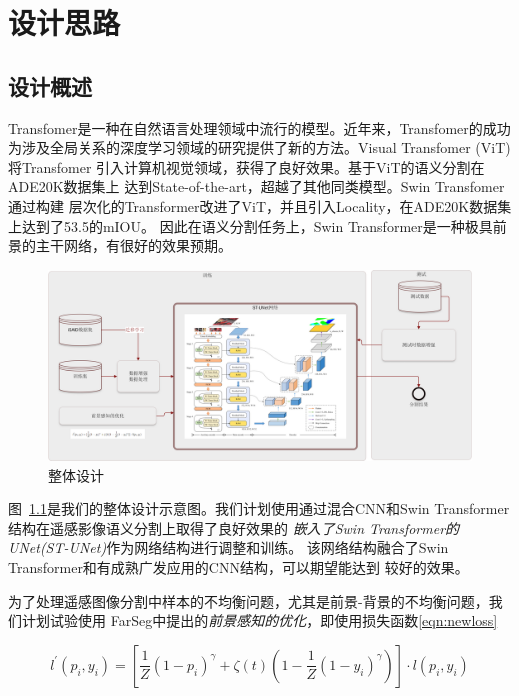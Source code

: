 \documentclass[a4paper,twoside,zihao=5,UTF8]{ctexrep}
\begin{document}
\part{设计思路}

\chapter{设计概述}
Transfomer是一种在自然语言处理领域中流行的模型。近年来，Transfomer的成功
为涉及全局关系的深度学习领域的研究提供了新的方法。Visual Transfomer (ViT)\cite{vit}将Transfomer
引入计算机视觉领域，获得了良好效果。基于ViT的语义分割\cite{segmenter}在ADE20K数据集上
达到State-of-the-art，超越了其他同类模型。Swin Transfomer\cite{swin}通过构建
层次化的Transformer改进了ViT，并且引入Locality，在ADE20K数据集上达到了53.5的mIOU。
因此在语义分割任务上，Swin Transformer是一种极具前景的主干网络，有很好的效果预期。

\begin{figure}[htbp]
    \includegraphics[width=\textwidth]{flowchart.png}
    \centering
    \caption{整体设计}
    \label{fig:fulldesign}
\end{figure}

图~\ref{fig:fulldesign}是我们的整体设计示意图。我们计划使用通过混合CNN和Swin Transformer结构在遥感影像语义分割上取得了良好效果的
\emph{嵌入了Swin Transformer的UNet(ST-UNet)}\cite{stunet}作为网络结构进行调整和训练。
该网络结构融合了Swin Transformer和有成熟广发应用的CNN结构，可以期望能达到
较好的效果。

为了处理遥感图像分割中样本的不均衡问题，尤其是前景-背景的不均衡问题，我们计划试验使用
FarSeg\cite{farseg}中提出的\emph{前景感知的优化}，即使用损失函数\eqref{eqn:newloss}

\begin{equation}
    \label{eqn:newloss}
    l^{'}(p_i,y_i)=[\frac{1}{Z}(1-p_i)^\gamma+\zeta (t)(1-\frac{1}{Z}(1-y_i)^\gamma)]\cdot l(p_i,y_i)
\end{equation}
\end{document}
